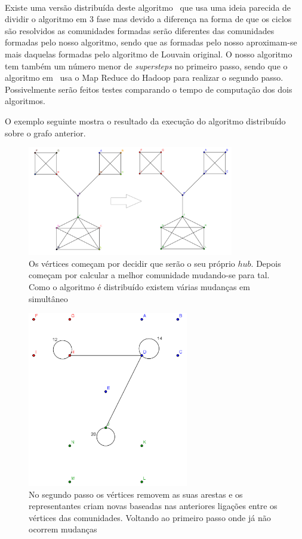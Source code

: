 \paragraph{}
Existe uma versão distribuída deste algoritmo~\cite{disLM} que usa uma ideia parecida de dividir o algoritmo em 3 fase mas devido a diferença na forma de que os ciclos são resolvidos as comunidades formadas serão diferentes das comunidades formadas pelo nosso algoritmo, sendo que as formadas pelo nosso aproximam-se mais daquelas formadas pelo algoritmo de Louvain original. O nosso algoritmo tem também um número menor de \textit{supersteps} no primeiro passo, sendo que o algoritmo em~\cite{disLM} usa o Map Reduce do Hadoop para realizar o segundo passo.
Possivelmente serão feitos testes comparando o tempo de computação dos dois algoritmos.


O exemplo seguinte mostra o resultado da execução do algoritmo distribuído sobre o grafo anterior.

\begin{figure}[h]
\centering
\includegraphics[width=90mm]{graphd1}
\caption*{Os vértices começam por decidir que serão o seu próprio $hub$. Depois começam por calcular a melhor comunidade mudando-se para tal. Como o algoritmo é distribuído existem várias mudanças em simultâneo}
\end{figure}
\begin{figure}[h]
\centering
\includegraphics[width=70mm]{graphd2}
\caption*{No segundo passo os vértices removem as suas arestas e os representantes criam novas baseadas nas anteriores ligações entre os vértices das comunidades. Voltando ao primeiro passo onde já não ocorrem mudanças}
\end{figure}
\clearpage